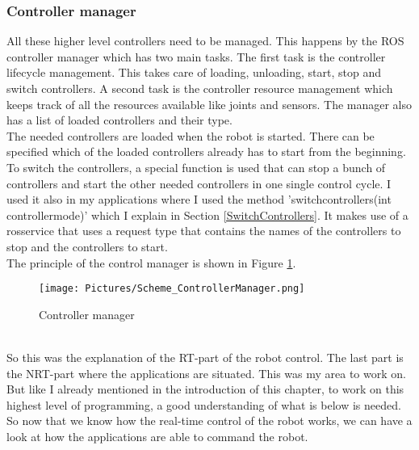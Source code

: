 \documentclass[11pt,a4paper]{report}
\begin{document}
\subsubsection{Controller manager}
All these higher level controllers need to be managed. This happens by the ROS controller manager which has two main tasks. The first task is the controller lifecycle management. This takes care of loading, unloading, start, stop and switch controllers. A second task is the controller resource management which keeps track of all the resources available like joints and sensors. The manager also has a list of loaded controllers and their type.\\
The needed controllers are loaded when the robot is started. There can be specified which of the loaded controllers already has to start from the beginning.\\
To switch the controllers, a special function is used that can stop a bunch of controllers and start the other needed controllers in one single control cycle. I used it also in my applications where I used the method 'switch\textunderscore controllers(int controller\textunderscore mode)' which I explain in Section \ref{SwitchControllers}. 
It makes use of a rosservice that uses a request type that contains the names of the controllers to stop and the controllers to start.\\ The principle of the control manager is shown in Figure \ref{fig:ControllerManager}.
\begin{figure}[!ht]
	\centering
	\texttt{[image: Pictures/Scheme\_ControllerManager.png]}
	\caption{Controller manager}
	\label{fig:ControllerManager}
\end{figure}\\
So this was the explanation of the RT-part of the robot control. The last part is the NRT-part where the applications are situated. This was my area to work on. But like I already mentioned in the introduction of this chapter, to work on this highest level of programming, a good understanding of what is below is needed. So now that we know how the real-time control of the robot works, we can have a look at how the applications are able to command the robot.
\newpage
\end{document}
